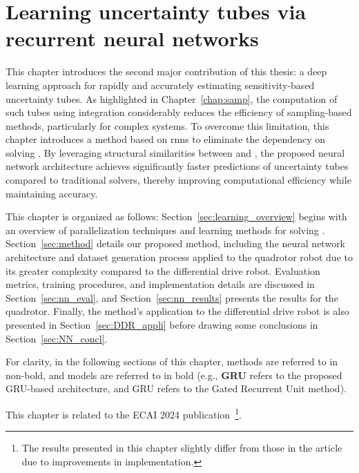 \chapter{Learning uncertainty tubes via recurrent neural networks} \label{chap:NN}


This chapter introduces the second major contribution of this thesis: a deep learning approach for rapidly and accurately estimating sensitivity-based uncertainty tubes. 
As highlighted in Chapter~\ref{chap:samp}, the computation of such tubes using  integration considerably reduces the efficiency of sampling-based methods, particularly for complex systems.
To overcome this limitation, this chapter introduces a method based on \gls{rnns} to eliminate the dependency on solving .
By leveraging structural similarities between  and , the proposed neural network architecture achieves significantly faster predictions of uncertainty tubes compared to traditional solvers, thereby improving computational efficiency while maintaining accuracy.

This chapter is organized as follows: Section~\ref{sec:learning_overview} begins with an overview of parallelization techniques and learning methods for solving .
Section~\ref{sec:method} details our proposed method, including the neural network architecture and dataset generation process applied to the quadrotor robot due to its greater complexity compared to the differential drive robot. 
Evaluation metrics, training procedures, and implementation details are discussed in Section~\ref{sec:nn_eval}, and Section~\ref{sec:nn_results} presents the results for the quadrotor. 
Finally, the method's application to the differential drive robot is also presented in Section~\ref{sec:DDR_appli} before drawing some conclusions in Section~\ref{sec:NN_concl}.

For clarity, in the following sections of this chapter, methods are referred to in non-bold, and models are referred to in bold (e.g., \textbf{GRU} refers to the proposed GRU-based architecture, and GRU refers to the Gated Recurrent Unit method).

This chapter is related to the ECAI 2024 publication~\cite{cECAI}\footnote{The results presented in this chapter slightly differ from those in the article due to improvements in implementation.}.

